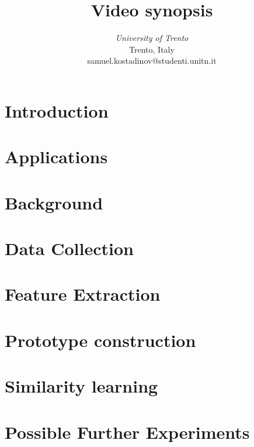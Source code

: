 \documentclass[conference]{IEEEtran}
\begin{document}
	\title{Video synopsis}


	\author{
	\textit{University of Trento}\\
	Trento, Italy \\
	samuel.kostadinov@studenti.unitn.it}


	\maketitle


	\begin{abstract} 
		
	\end{abstract}


	\section{Introduction}
		
		
	\section{Applications}
	

	\section{Background}
	
				
	\section{Data Collection}


	\section{Feature Extraction\label{sec:fe}}


	\section{Prototype construction}


	\section{Similarity learning}
	
			
	\section{Possible Further Experiments}
	
		
	\nocite{*}
	\printbibliography
\end{document}

